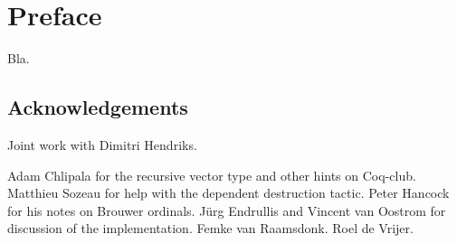\chapter*{Preface}

Bla.


\section*{Acknowledgements}

Joint work with Dimitri Hendriks.

Adam Chlipala for the recursive vector type and other hints on
Coq-club. Matthieu Sozeau for help with the dependent destruction
tactic. Peter Hancock for his notes on Brouwer ordinals. J\"urg Endrullis and
Vincent van Oostrom for discussion of the implementation. Femke van
Raamsdonk. Roel de Vrijer.

